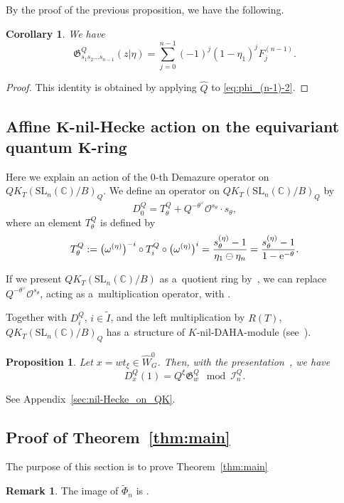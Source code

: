 \documentclass[10pt,a4paper]{amsart}
\numberwithin{equation}{section}
\newcommand{\C}{\mathbb{C}}
\newcommand{\Gro}[1]{\mathfrak{G}^Q_{#1}}
\newcommand{\Iaf}{\tilde{I}}
\newcommand{\Rep}{{R(T)}}
\newcommand{\SL}{\mathrm{SL}}
\newtheorem{Corollary}[Theorem]{Corollary}
\newtheorem{Proposition}[Theorem]{Proposition}
\theoremstyle{definition}
\newtheorem{Remark}[Theorem]{Remark}
\begin{document}
By the proof of the previous
proposition, we have the following.
\begin{Corollary}\label{cor:phi_(n-1)}
We have
\[
\Gro{s_1s_2\dots s_{n-1}}(z|\eta)=
\sum_{j=0}^{n-1}(-1)^j(1-\eta_{1})^{j}F_j^{(n-1)}.
\]
\end{Corollary}
\begin{proof} This identity is obtained by
applying $\hat{Q}$ to
\eqref{eq:phi_(n-1)-2}.
\end{proof}





\subsection[Affine K-nil-Hecke action on the equivariant quantum K-ring]{Affine $\boldsymbol{K}$-nil-Hecke action on the equivariant quantum $\boldsymbol{K}$-ring}
Here we explain an action of
the $0$-th Demazure operator on
$QK_T(\SL_n(\C)/B)_Q$.
We define an operator  on
$QK_T(\SL_n(\C)/B)_Q$ by
\begin{equation}
\label{eq:D0Q}
D_0^Q=T^{Q}_{\theta}+
Q^{-\theta^\vee}
\mathscr{O}^{s_\theta}\cdot
s_\theta,
\end{equation}
where an element $T^Q_\theta$ is defined by
\[
T^Q_\theta:=\bigl(\omega^{(\eta)}\bigr)^{-i}\circ T^Q_i\circ \bigl(\omega^{(\eta)}\bigr)^i=\frac{s_\theta^{(\eta)}-1}{\eta_1\ominus\eta_n}=\frac{s^{(\eta)}_\theta-1}{1-{\rm e}^{-\theta}}.
\]

If we present $QK_T(\SL_n(\C)/B)$ as a~quotient ring by~\cite{MNS1}, we can replace
$Q^{-\theta^\vee}\mathscr{O}^{s_\theta}$, acting as a~multiplication operator,
with \smash{$Q^{-\theta^\vee}\Gro{s_\theta}$}.

Together with $D_i^Q$, $i\in \Iaf$, and the left multiplication by $R(T)$,
 $QK_T(\SL_n(\C)/B)_Q$ has a~structure of $K$-nil-DAHA-module (see~\cite{KNS,KoNOS,Orr}).


\begin{Proposition}\label{prop:Quantum_D(1)}
Let $x=wt_\xi\in \hat{W}_G^0$. Then, with the presentation~{\rm\cite{MNS1}}, we have
\[%
D_x^Q(1)
=Q^\xi \Gro{w} \mod \mathscr{I}_n^Q.
\]
\end{Proposition}
See Appendix~\ref{sec:nil-Hecke_on_QK}.


\subsection{Proof of Theorem~\ref{thm:main}}
The purpose of this section is to prove Theorem~\ref{thm:main}
\begin{Remark}
The image of $\tilde{\Phi}_n$ is \smash{$\hat{\Lambda}_{(n)}^\Rep\big[\sigma_i^{-1},(\sigma(\sigma_i))^{-1}|1\leq i\leq n\big]$}.
\end{Remark}
\end{document}
